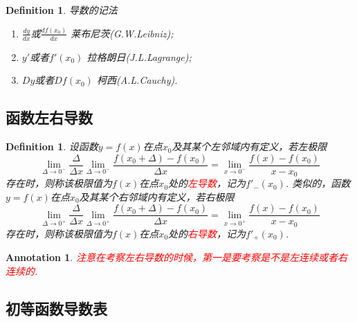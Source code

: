 \documentclass{article}
\newtheorem{definition}[theorem]{Definition}
\newtheorem{annotation}[theorem]{Annotation}
\newcommand{\redt}[1]{\textcolor{red}{#1}}
\begin{document}
\begin{definition}
\rm {\color{red} 导数的记法}
\begin{enumerate}
	\item $\frac{dy}{dx}$或$\frac{df(x_0)}{dx}$ 莱布尼茨(G.W.Leibniz);
	\item $y'$或者$f'(x_0)$ 拉格朗日(J.L.Lagrange);
	\item $Dy$或者$Df(x_0)$ 柯西(A.L.Cauchy).
\end{enumerate}
\end{definition}

\subsection{函数左右导数}

\begin{definition}
\rm 设函数$y=f(x)$在点$x_0$及其某个左邻域内有定义，若左极限
$$
\lim\limits_{\Delta \to 0^{-}} \frac{\Delta}{\Delta x} \lim\limits_{\Delta \to 0^{-}} \frac{f(x_0 + \Delta)-f(x_0)}{\Delta x} = \lim\limits_{x \to 0^{-}} \frac{f(x)-f(x_0)}{x-x_0} 
$$
存在时，则称该极限值为$f(x)$在点$x_0$处的\redt{左导数}，记为$f'_{-}(x_0)$. 类似的，函数$y=f(x)$在点$x_0$及其某个右邻域内有定义，若右极限
$$
\lim\limits_{\Delta \to 0^{+}} \frac{\Delta}{\Delta x} \lim\limits_{\Delta \to 0^{+}} \frac{f(x_0 + \Delta)-f(x_0)}{\Delta x} = \lim\limits_{x \to 0^{+}} \frac{f(x)-f(x_0)}{x-x_0} 
$$
存在时，则称该极限值为$f(x)$在点$x_0$处的\redt{右导数}，记为$f'_{+}(x_0)$.
\end{definition}

\begin{annotation}
\rm \redt{注意在考察左右导数的时候，第一是要考察是不是左连续或者右连续的}. 
\end{annotation}

\newpage
\subsection{初等函数导数表}
\end{document}
